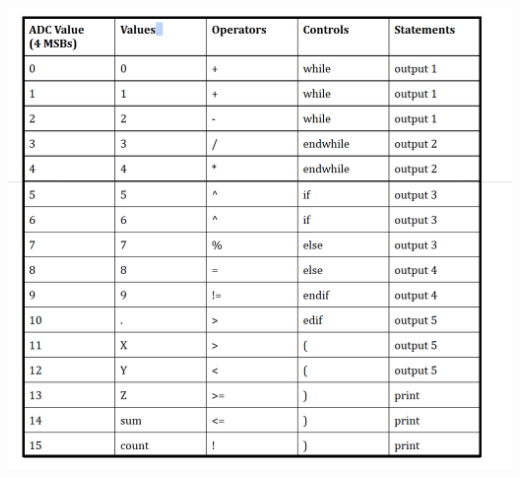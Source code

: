 \documentclass[12pt,a4paper]{article}
\begin{document}
    
     \includegraphics[width=6.5in]{lxer.png}
\end{document}
